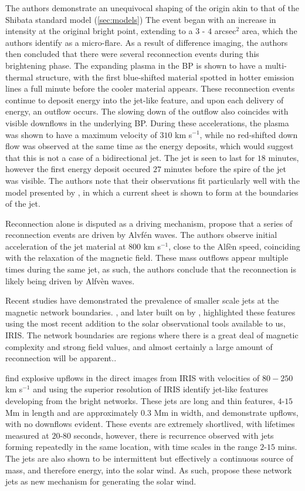 The authors demonstrate an unequivocal shaping of the origin akin to that of the Shibata standard model (\ref{sec:models})
The event began with an increase in intensity at the original bright point, extending to a $3$ - $4$ arcsec$^2$ area, which the authors identify as a micro-flare.
As a result of difference imaging, the authors then concluded that there were several reconnection events during this brightening phase.
The expanding plasma in the BP is shown to have a multi-thermal structure, with the first blue-shifted material spotted in hotter emission lines a full minute before the cooler material appears.
These reconnection events continue to deposit energy into the jet-like feature, and upon each delivery of energy, an outflow occurs.
The slowing down of the outflow also coincides with visible downflows in the underlying BP.
During these accelerations, the plasma was shown to have a maximum velocity of $310$ km s$^{-1}$, while no red-shifted down flow was observed at the same time as the energy deposits, which would suggest that this is not a case of a bidirectional jet.
The jet is seen to last for $18$ minutes, however the first energy deposit occured $27$ minutes before the spire of the jet was visible.
The authors note that their observations fit particularly well with the model presented by \cite{Moreno2008}, in which a current sheet is shown to form at the boundaries of the jet.

Reconnection alone is disputed as a driving mechanism, \cite{Cirtain2007} propose that a series of reconnection events are driven by Alvf{\'e}n waves.
The authors observe initial acceleration of the jet material at $800$ km s$^{-1}$, close to the Alf{\`e}n speed, coinciding with the relaxation of the magnetic field.
These mass outflows appear multiple times during the same jet, as such, the authors conclude that the reconnection is likely being driven by Alfv{\`e}n waves.

Recent studies have demonstrated the prevalence of smaller scale jets at the magnetic network boundaries.
\cite{Tian2014}, and later built on by \cite{Narang2016}, highlighted these features using the most recent addition to the solar observational tools available to us, IRIS.
The network boundaries are regions where there is a great deal of magnetic complexity and strong field values, and almost certainly a large amount of reconnection will be apparent.. 

\cite{Narang2016} find explosive upflows in the direct images from IRIS with velocities of $80-250$ km s$^{-1}$ and using the superior resolution of IRIS identify jet-like features developing from the bright networks.
These jets are long and thin features, $4$-$15$ Mm in length and are approximately $0.3$ Mm in width, and demonstrate upflows, with no downflows evident.
These events are extremely shortlived, with lifetimes measured at $20$-$80$ seconds, however, there is recurrence observed with jets forming repeatedly in the same location, with time scales in the range $2$-$15$ mins.
The jets are also shown to be intermittent but effectively a continuous source of mass, and therefore energy, into the solar wind.
As such, \cite{Narang2016} propose these network jets as new mechanism for generating the solar wind.


